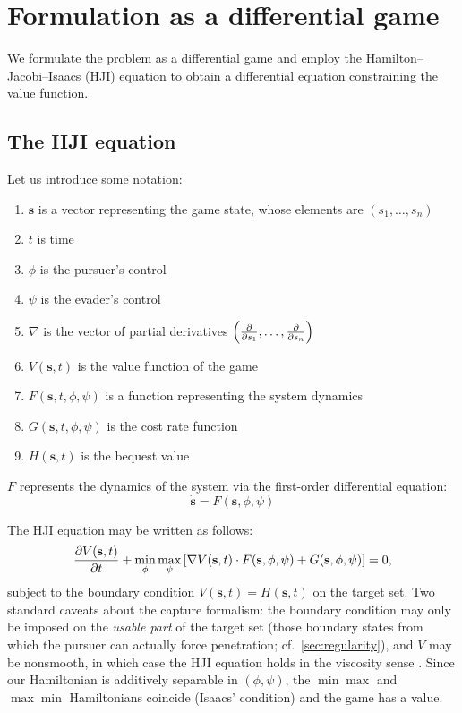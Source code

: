 \documentclass{article}
\renewcommand{\vec}[1]{\mathbf{#1}}
\theoremstyle{remark}
\begin{document}
\section{Formulation as a differential game}
\label{sec:hji}

We formulate the problem as a differential game and employ the
Hamilton--Jacobi--Isaacs (HJI) equation \cite{isaacs1965,evanssouganidis1984}
to obtain a differential equation constraining the value function.

\subsection{The HJI equation}

Let us introduce some notation:
\begin{enumerate}
\item $\vec{s}$ is a vector representing the game state, whose elements are
$(s_1, \dots, s_n)$
\item $t$ is time
\item $\phi$ is the pursuer's control
\item $\psi$ is the evader's control
\item $\nabla$ is the vector of partial derivatives $\left(\pdv{}{s_1}, \dots,
\pdv{}{s_n}\right)$
\item $V(\vec{s}, t)$ is the value function of the game
\item $F(\vec{s}, t, \phi, \psi)$ is a function representing the system dynamics
\item $G(\vec{s}, t, \phi, \psi)$ is the cost rate function
\item $H(\vec{s}, t)$ is the bequest value
\end{enumerate}

$F$ represents the dynamics of the system via the first-order differential
equation:
\begin{equation}
\dot{\vec{s}} = F(\vec{s}, \phi, \psi)
\end{equation}

The HJI equation may be written as follows:
\begin{align}
\pdv{V(\vec{s}, t)}{t} + \min_{\phi} \max_{\psi} \left[
  \nabla V(\vec{s}, t) \cdot F(\vec{s}, \phi, \psi) + G(\vec{s}, \phi, \psi)
\right] = 0,
\end{align}
subject to the boundary condition $V(\vec{s}, t) = H(\vec{s}, t)$ on the
target set.  Two standard caveats about the capture formalism: the boundary
condition may only be imposed on the \emph{usable part} of the target set
(those boundary states from which the pursuer can actually force penetration;
cf.\ \cref{sec:regularity}), and $V$ may be nonsmooth, in which case the HJI
equation holds in the viscosity sense
\cite{crandalllions1983,evanssouganidis1984}.  Since our Hamiltonian is
additively separable in $(\phi, \psi)$, the $\min\max$ and $\max\min$
Hamiltonians coincide (Isaacs' condition) and the game has a value.
\end{document}
